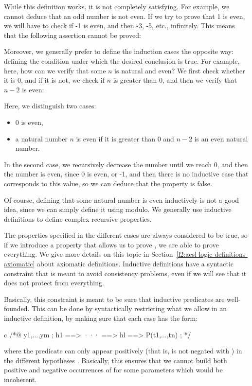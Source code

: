 While this definition works, it is not completely satisfying. For example, we
cannot deduce that an odd number is not even. If we try to prove that 1 is even,
we will have to check if -1 is even, and then -3, -5, etc., infinitely.
This means that the following assertion cannot be proved:





Moreover, we generally prefer to define the induction cases the opposite way:
defining the condition under which the desired conclusion is true. For example,
here, how can we verify that some $n$ is natural and even? We first check
whether it is 0, and if it is not, we check if $n$ is greater than $0$, and then we verify
that $n-2$ is even:






Here, we distinguish two cases:
\begin{itemize}
\item 0 is even,
\item a natural number $n$ is even if it is greater than 0 and $n-2$ is an even
      natural number.
\end{itemize}

In the second case, we recursively decrease the number until we reach
0, and then the number is even, since 0 is even, or -1, and then there
is no inductive case that corresponds to this value, so we can
deduce that the property is false.




Of course, defining that some natural number is even inductively is not a
good idea, since we can simply define it using modulo. We generally use
inductive definitions to define complex recursive properties.




The properties specified in the different cases are always considered to be true,
so if we introduce a property that allows us to prove , we are
able to prove everything. We give more details on this topic in
Section~\ref{l2:acsl-logic-definitions-axiomatic} about axiomatic definitions.
Inductive definitions have a syntactic constraint that is meant to avoid
consistency problems, even if we will see that it does not protect from
everything.


Basically, this constraint is meant to be sure that inductive predicates are
well-founded. This can be done by syntactically restricting what we allow in an
inductive definition, by making sure that each case has the form:
\begin{CodeBlock}{c}
/*@
  \forall y1,...,ym ; h1 ==> ··· ==> hl ==> P(t1,...,tn) ;
*/
\end{CodeBlock}
where the predicate  can only appear positively (that
is,  is not negated with \CodeInline{!}) in the
different hypotheses . Basically, this ensures that we cannot
build both positive and negative occurrences of  for some
parameters which would be incoherent.


